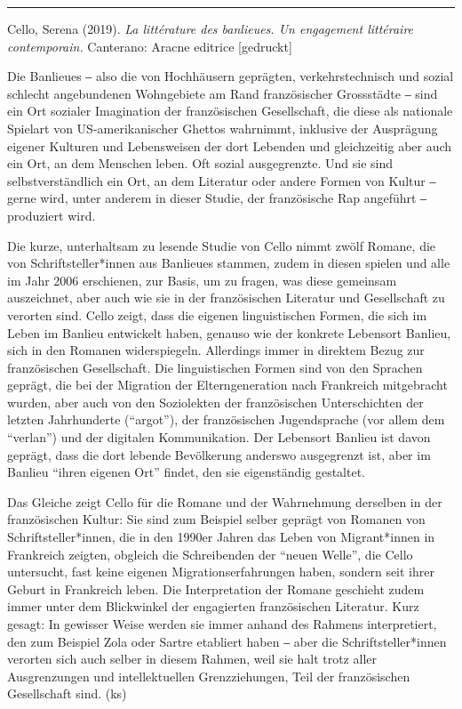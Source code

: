 \documentclass[a4paper,
fontsize=11pt,
oneside,
numbers=noperiodatend,
parskip=half-,
bibliography=totoc,
final
]{scrartcl}
\begin{document}
\begin{center}\rule{0.5\linewidth}{0.5pt}\end{center}

Cello, Serena (2019). \emph{La littérature des banlieues. Un engagement
littéraire contemporain.} Canterano: Aracne editrice {[}gedruckt{]}

Die Banlieues ‒ also die von Hochhäusern geprägten, verkehrstechnisch
und sozial schlecht angebundenen Wohngebiete am Rand französischer
Grossstädte ‒ sind ein Ort sozialer Imagination der französischen
Gesellschaft, die diese als nationale Spielart von US-amerikanischer
Ghettos wahrnimmt, inklusive der Ausprägung eigener Kulturen und
Lebensweisen der dort Lebenden und gleichzeitig aber auch ein Ort, an
dem Menschen leben. Oft sozial ausgegrenzte. Und sie sind
selbstverständlich ein Ort, an dem Literatur oder andere Formen von
Kultur ‒ gerne wird, unter anderem in dieser Studie, der französische
Rap angeführt ‒ produziert wird.

Die kurze, unterhaltsam zu lesende Studie von Cello nimmt zwölf Romane,
die von Schriftsteller*innen aus Banlieues stammen, zudem in diesen
spielen und alle im Jahr 2006 erschienen, zur Basis, um zu fragen, was
diese gemeinsam auszeichnet, aber auch wie sie in der französischen
Literatur und Gesellschaft zu verorten sind. Cello zeigt, dass die
eigenen linguistischen Formen, die sich im Leben im Banlieu entwickelt
haben, genauso wie der konkrete Lebensort Banlieu, sich in den Romanen
widerspiegeln. Allerdings immer in direktem Bezug zur französischen
Gesellschaft. Die linguistischen Formen sind von den Sprachen geprägt,
die bei der Migration der Elterngeneration nach Frankreich mitgebracht
wurden, aber auch von den Soziolekten der französischen Unterschichten
der letzten Jahrhunderte (\enquote{argot}), der französischen
Jugendsprache (vor allem dem \enquote{verlan}) und der digitalen
Kommunikation. Der Lebensort Banlieu ist davon geprägt, dass die dort
lebende Bevölkerung anderswo ausgegrenzt ist, aber im Banlieu
\enquote{ihren eigenen Ort} findet, den sie eigenständig gestaltet.

Das Gleiche zeigt Cello für die Romane und der Wahrnehmung derselben in
der französischen Kultur: Sie sind zum Beispiel selber geprägt von
Romanen von Schriftsteller*innen, die in den 1990er Jahren das Leben von
Migrant*innen in Frankreich zeigten, obgleich die Schreibenden der
\enquote{neuen Welle}, die Cello untersucht, fast keine eigenen
Migrationserfahrungen haben, sondern seit ihrer Geburt in Frankreich
leben. Die Interpretation der Romane geschieht zudem immer unter dem
Blickwinkel der engagierten französischen Literatur. Kurz gesagt: In
gewisser Weise werden sie immer anhand des Rahmens interpretiert, den
zum Beispiel Zola oder Sartre etabliert haben ‒ aber die
Schriftsteller*innen verorten sich auch selber in diesem Rahmen, weil
sie halt trotz aller Ausgrenzungen und intellektuellen Grenzziehungen,
Teil der französischen Gesellschaft sind. (ks)
\end{document}
